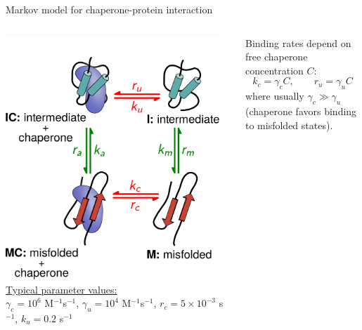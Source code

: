 \documentclass{beamer}
\begin{document}
\begin{frame}{Markov model for chaperone-protein interaction}

  \begin{columns}[T]
    \centering
    \includegraphics[width=0.95\textwidth]{markov2.pdf}\\[0.5em]
        {\small{\color{blue} \underline{Typical parameter values:}\\ $\gamma_c = 10^6$ M$^{-1}$s$^{-1}$, $\gamma_u =  10^4$ M$^{-1}$s$^{-1}$, $r_c = 5 \times 10^{-3}$ s$^{-1}$, $k_u = 0.2$ s$^{-1}$}}

     \vspace{0.5in} {\small Binding rates depend on free chaperone
    concentration $C$:
    \[
    k_c = \gamma_c C, \qquad r_u = \gamma_u C
    \]
    where usually $\gamma_c \gg \gamma_u$ (chaperone favors binding
    to misfolded states).\\[1em]}
    \end{columns}
\end{frame}
\end{document}
